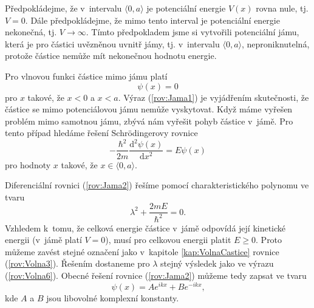 Předpokládejme, že v~intervalu $\langle0,a\rangle$ je potenciální energie $V(x)$ rovna nule, tj. $V = 0$. Dále předpokládejme, že mimo tento interval je potenciální energie nekonečná, tj. $V \rightarrow \infty$. Tímto předpokladem jsme si vytvořili potenciální jámu, která je pro částici uvězněnou uvnitř jámy, tj. v~intervalu $\langle0,a\rangle$, neproniknutelná, protože částice nemůže mít nekonečnou hodnotu energie.

Pro vlnovou funkci částice mimo jámu platí
\begin{equation}
\psi(x) = 0
\label{rov:Jama1}
\end{equation}
pro $x$ takové, že $x < 0$ a $x< a$. Výraz (\ref{rov:Jama1}) je vyjádřením skutečnosti, že částice se mimo potenciálovou jámu nemůže vyskytovat. Když máme vyřešen problém mimo samotnou jámu, zbývá nám vyřešit pohyb částice v~jámě. Pro tento případ hledáme řešení Schrödingerovy rovnice
\begin{equation}
-\frac{\hbar^2}{2m} \frac{\mathrm{d}^2\psi(x)}{\mathrm{d}x^2} = E \psi(x)
\label{rov:Jama2}
\end{equation}
pro hodnoty $x$ takové, že $x\in\langle 0,a\rangle $.

Diferenciální rovnici (\ref{rov:Jama2}) řešíme pomocí charakteristického polynomu ve tvaru
\begin{equation}
\lambda^2 + \frac{2mE}{\hbar^2} = 0 \mbox{.}
\label{rov:Jama3}
\end{equation}
Vzhledem k~tomu, že celková energie částice v~jámě odpovídá její kinetické energii (v~jámě platí $V = 0$), musí pro celkovou energii platit $E\geq0$. Proto můžeme zavést stejné označení jako v~kapitole \ref{kap:VolnaCastice} rovnice (\ref{rov:Volna3}). Řešením dostaneme pro $\lambda$ stejný výsledek jako ve výrazu (\ref{rov:Volna6}). Obecné řešení rovnice (\ref{rov:Jama2}) můžeme tedy zapsat ve tvaru
\begin{equation}
\psi(x) = Ae^{ikx} + Be^{-ikx} \mbox{,}
\label{rov:Jama4}
\end{equation}
kde $A$ a $B$ jsou libovolné komplexní konstanty.

